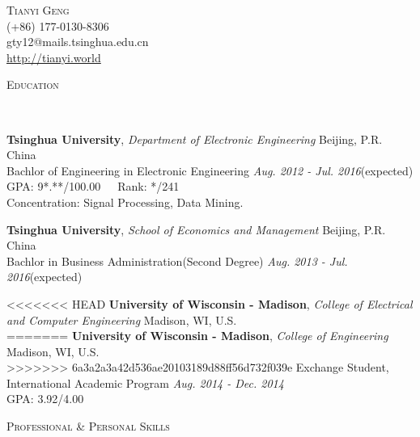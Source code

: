 \documentclass[9pt]{article}
\newenvironment{changemargin}[2]{%
  \begin{list}{}{%
    \setlength{\topsep}{0pt}%
    \setlength{\leftmargin}{#1}%
    \setlength{\rightmargin}{#2}%
    \setlength{\listparindent}{\parindent}%
    \setlength{\itemindent}{\parindent}%
    \setlength{\parsep}{\parskip}%
  }%
  \item[]}{\end{list}
}
\newcommand{\lineover}{
	\begin{changemargin}{-0.05in}{-0.05in}
		\vspace*{-8pt}
		\hrulefill \\
		\vspace*{-2pt}
	\end{changemargin}
}
\newcommand{\header}[1]{
	\begin{changemargin}{-0.5in}{-0.5in}
		\scshape{#1}\\
  	\lineover
	\end{changemargin}
}
\newcommand{\contact}[4]{
	\begin{changemargin}{-0.5in}{-0.5in}
		\begin{center}
			{\Large \scshape {#1}}\\ \smallskip
			{#2}\\ \smallskip 
			{#3}\\ \smallskip
			{#4}\smallskip
		\end{center}
	\end{changemargin}
}
\newenvironment{body} {
	\vspace*{-16pt}
	\begin{changemargin}{-0.25in}{-0.5in}
  }	
	{\end{changemargin}
}
\begin{document}
\contact{Tianyi Geng}{(+86) 177-0130-8306}{gty12@mails.tsinghua.edu.cn}{\href{http://tianyi.world}{http://tianyi.world}}

\header{Education}

\begin{body}
	\vspace{14pt}

	\textbf{Tsinghua University}, \emph{Department of Electronic Engineering} \hfill Beijing, P.R. China \\
Bachlor of Engineering in Electronic Engineering \hfill \emph{Aug. 2012 - Jul. 2016}(expected){} \\
GPA: 9*.**/100.00\ \ \ Rank: */241\\
Concentration: Signal Processing, Data Mining. \\
\vspace{6pt}

	\textbf{Tsinghua University}, \emph{School of Economics and Management} \hfill Beijing, P.R. China \\
Bachlor in Business Administration(Second Degree) \hfill \emph{Aug. 2013 - Jul. 2016}(expected){} \\
\vspace{6pt}

<<<<<<< HEAD
	\textbf{University of Wisconsin - Madison}, \emph{College of Electrical and Computer Engineering} \hfill Madison, WI, U.S. \\
=======
	\textbf{University of Wisconsin - Madison}, \emph{College of Engineering} \hfill Madison, WI, U.S. \\
>>>>>>> 6a3a2a3a42d536ae20103189d88ff56d732f039e
	Exchange Student, International Academic Program \hfill \emph{Aug. 2014 - Dec. 2014}{} \\
GPA: 3.92/4.00\\


\end{body}

\smallskip
\smallskip

\header{Professional \& Personal Skills}
\end{document}
